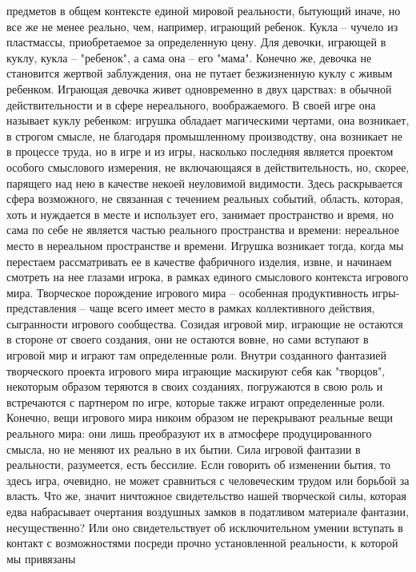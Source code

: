 \documentclass[12pt]{article}
\begin{document}
предметов в общем контексте единой мировой реальности, бытующий иначе, но все же не менее реально, чем,
например,  играющий  ребенок.  Кукла  --  чучело  из  пластмассы,  приобретаемое  за  определенную  цену.  Для
девочки, играющей в куклу, кукла -- "ребенок", а сама она -- его "мама". Конечно же, девочка не становится
жертвой заблуждения, она не путает безжизненную куклу с живым ребенком.
Играющая девочка живет одновременно в двух царствах: в обычной действительности и в сфере нереального,
воображаемого.  В  своей  игре  она  называет  куклу  ребенком:  игрушка  обладает  магическими  чертами,  она
возникает, в строгом смысле, не благодаря промышленному производству, она возникает не в процессе труда, но
в игре и из игры, насколько последняя является проектом особого смыслового измерения, не включающаяся в
действительность, но, скорее, парящего над нею в качестве некоей неуловимой видимости. Здесь раскрывается
сфера возможного, не связанная с течением реальных событий, область, которая, хоть и нуждается в месте и
использует его, занимает пространство и время, но сама по себе не является частью реального пространства и
времени:  нереальное  место  в  нереальном  пространстве  и  времени.  Игрушка  возникает  тогда,  когда  мы
перестаем рассматривать ее в качестве фабричного изделия, извне, и начинаем смотреть на нее глазами игрока,
в рамках единого смыслового контекста игрового мира. Творческое порождение игрового мира -- особенная
продуктивность игры-представления -- чаще всего имеет место в рамках коллективного действия, сыгранности
игрового сообщества. Созидая игровой мир, играющие не остаются в стороне от своего создания, они не
остаются  вовне,  но  сами  вступают  в  игровой  мир  и  играют  там  определенные  роли.  Внутри  созданного
фантазией творческого проекта игрового мира играющие маскируют себя как "творцов", некоторым образом
теряются в своих созданиях, погружаются в свою роль и встречаются с партнером по игре, которые также
играют определенные роли. Конечно, вещи игрового мира никоим образом не перекрывают реальные вещи
реального мира: они лишь преобразуют их в атмосфере продуцированного смысла, но не меняют их реально в
их бытии. Сила игровой фантазии в реальности, разумеется, есть бессилие. Если говорить об изменении бытия,
то здесь игра, очевидно, не может сравниться с человеческим трудом или борьбой за власть. Что же, значит
ничтожное свидетельство нашей творческой силы, которая едва набрасывает очертания воздушных замков в
податливом  материале  фантазии,  несущественно?  Или  оно  свидетельствует  об  исключительном  умении
вступать в контакт с возможностями посреди прочно установленной реальности, к которой мы привязаны
\end{document}
